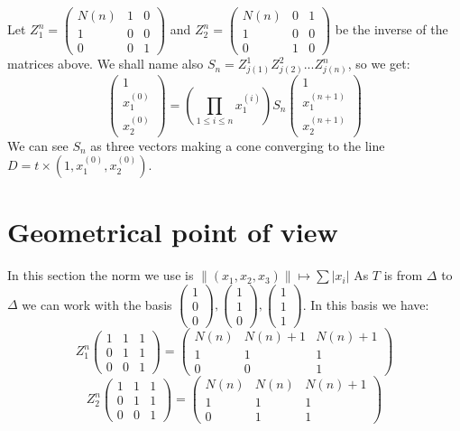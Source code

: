 \documentclass[12pt]{article}
\theoremstyle{plain}%
\theoremstyle{definition}
\theoremstyle{remark}
\begin{document}
Let $Z_1^n=\begin{pmatrix} N(n) & 1 & 0 \\1 & 0 & 0 \\0 & 0 & 1 \end{pmatrix}$ and $Z_2^n=\begin{pmatrix} N(n) & 0 & 1 \\1 & 0 & 0 \\0 & 1 & 0 \end{pmatrix}$ be the inverse of the matrices above. We shall name also $S_n=Z_{j(1)}^1 Z_{j(2)}^2 ... Z_{j(n)}^n$, so we get:\[
\begin{pmatrix} 1 \\ x_1^{(0)} \\ x_2^{(0)} \end{pmatrix} = (\prod_{1 \leq i \leq n} x_1^{(i)})S_n \begin{pmatrix} 1 \\ x_1^{(n+1)} \\ x_2^{(n+1)} \end{pmatrix}
\]
We can see $S_n$ as three vectors making a cone converging to the line $D=t \times (1,x_1^{(0)},x_2^{(0)})$. \newline

\section{Geometrical point of view}
In this section the norm we use is $\|(x_1,x_2,x_3)\| \mapsto \sum |x_i|$\newline
As $T$ is from $\Delta$ to $\Delta$ we can work with the basis $\begin{pmatrix} 1 \\ 0 \\ 0 \end{pmatrix},\begin{pmatrix} 1 \\ 1 \\ 0 \end{pmatrix}, \begin{pmatrix} 1 \\ 1 \\ 1 \end{pmatrix}$. In this basis we have: \[
Z_1^n \begin{pmatrix} 1 & 1 & 1 \\ 0 & 1 & 1 \\ 0 & 0 & 1 \end{pmatrix}=
\begin{pmatrix} N(n) & N(n)+1 & N(n)+1 \\ 1 & 1 & 1 \\ 0 & 0 & 1 \end{pmatrix}
\]
\[
Z_2^n \begin{pmatrix} 1 & 1 & 1 \\ 0 & 1 & 1 \\ 0 & 0 & 1 \end{pmatrix}=
\begin{pmatrix} N(n) & N(n) & N(n)+1 \\ 1 & 1 & 1 \\ 0 & 1 & 1 \end{pmatrix}
\]
\end{document}
